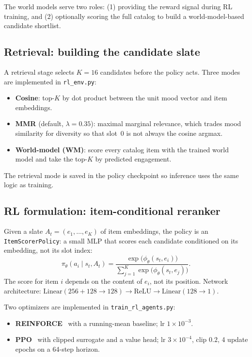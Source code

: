 \documentclass[11pt]{article}
\begin{document}
The world models serve two roles: (1) providing the reward signal during
RL training, and (2) optionally scoring the full catalog to build a
world-model-based candidate shortlist.

\subsection{Retrieval: building the candidate slate}
\label{sec:method-retrieval}

A retrieval stage selects $K{=}16$ candidates before the policy acts.
Three modes are implemented in \texttt{rl\_env.py}:
\begin{itemize}[leftmargin=*, itemsep=1pt]
    \item \textbf{Cosine}: top-$K$ by dot product between the unit mood
    vector and item embeddings.
    \item \textbf{MMR} (default, $\lambda{=}0.35$): maximal marginal
    relevance, which trades mood similarity for diversity so that slot~0
    is not always the cosine argmax.
    \item \textbf{World-model (WM)}: score every catalog item with the
    trained world model and take the top-$K$ by predicted engagement.
\end{itemize}
The retrieval mode is saved in the policy checkpoint so inference uses
the same logic as training.

\subsection{RL formulation: item-conditional reranker}
\label{sec:method-rl}

Given a slate $A_t = (e_1, \ldots, e_K)$ of item embeddings, the policy
is an \texttt{ItemScorerPolicy}: a small MLP that scores each candidate
conditioned on its embedding, not its slot index:
\[
    \pi_\theta(a_i \mid s_t, A_t)
    = \frac{\exp\!\bigl(\phi_\theta(s_t, e_i)\bigr)}
           {\sum_{j=1}^{K} \exp\!\bigl(\phi_\theta(s_t, e_j)\bigr)}.
\]
The score for item $i$ depends on the content of $e_i$, not its
position. Network architecture: $\text{Linear}(256{+}128 \rightarrow
128) \rightarrow \text{ReLU} \rightarrow \text{Linear}(128 \rightarrow
1)$.

Two optimizers are implemented in \texttt{train\_rl\_agents.py}:
\begin{itemize}[leftmargin=*, itemsep=1pt]
    \item \textbf{REINFORCE}~\cite{williams1992reinforce} with a
    running-mean baseline; lr $1{\times}10^{-3}$.
    \item \textbf{PPO}~\cite{schulman2017ppo} with clipped surrogate
    and a value head; lr $3{\times}10^{-4}$, clip $0.2$, 4 update
    epochs on a 64-step horizon.
\end{itemize}
\end{document}
